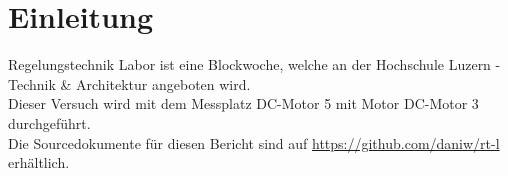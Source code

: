 \section*{Einleitung}
Regelungstechnik Labor ist eine Blockwoche, welche an der Hochschule Luzern - 
Technik \& Architektur angeboten wird. \\
Dieser Versuch wird mit dem Messplatz DC-Motor 5 mit Motor DC-Motor 3 durchgeführt. \\
Die Sourcedokumente für diesen Bericht sind auf \url{https://github.com/daniw/rt-l}
erhältlich. 
